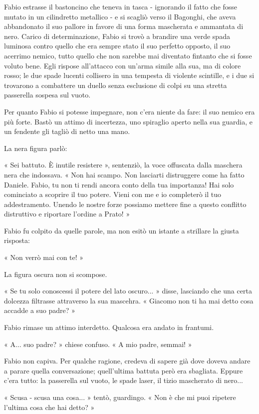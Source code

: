 Fabio estrasse il bastoncino che teneva in tasca - ignorando il fatto che fosse mutato in un cilindretto metallico - e si scagliò verso il Bagonghi, che aveva abbandonato il suo pallore in favore di una forma mascherata e ammantata di nero. Carico di determinazione, Fabio si trovò a brandire una verde spada luminosa contro quello che era sempre stato il suo perfetto opposto, il suo acerrimo nemico, tutto quello che non sarebbe mai diventato fintanto che si fosse voluto bene. Egli rispose all'attacco con un'arma simile alla sua, ma di colore rosso; le due spade lucenti collisero in una tempesta di violente scintille, e i due si trovarono a combattere un duello senza esclusione di colpi su una stretta passerella sospesa sul vuoto.

Per quanto Fabio si potesse impegnare, non c'era niente da fare: il suo nemico era più forte. Bastò un attimo di incertezza, uno spiraglio aperto nella sua guardia, e un fendente gli tagliò di netto una mano.

La nera figura parlò:

« Sei battuto. È inutile resistere », sentenziò, la voce offuscata dalla maschera nera che indossava. « Non hai scampo. Non lasciarti distruggere come ha fatto Daniele. Fabio, tu non ti rendi ancora conto della tua importanza! Hai solo cominciato a scoprire il tuo potere. Vieni con me e io completerò il tuo addestramento. Unendo le nostre forze possiamo mettere fine a questo conflitto distruttivo e riportare l'ordine a Prato! »

Fabio fu colpito da quelle parole, ma non esitò un istante a strillare la giusta risposta:

« Non verrò mai con te! »

La figura oscura non si scompose.

« Se tu solo conoscessi il potere del lato oscuro... » disse, lasciando che una certa dolcezza filtrasse attraverso la sua mascehra. « Giacomo non ti ha mai detto cosa accadde a suo padre? »

Fabio rimase un attimo interdetto. Qualcosa era andato in frantumi.

« A... suo padre? » chiese confuso. « A mio padre, semmai! »

Fabio non capiva. Per qualche ragione, credeva di sapere già dove doveva andare a parare quella conversazione; quell'ultima battuta però era sbagliata. Eppure c'era tutto: la passerella sul vuoto, le spade laser, il tizio mascherato di nero...

« Scusa - scusa una cosa... » tentò, guardingo. « Non è che mi puoi ripetere l'ultima cosa che hai detto? »

